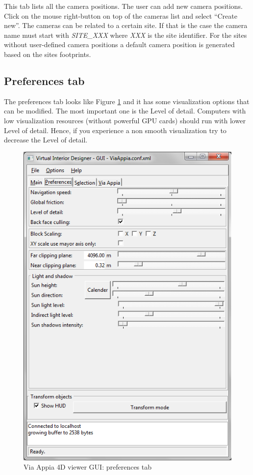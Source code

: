 \documentclass[a4paper,11pt]{article}
\begin{document}
This tab lists all the camera positions. The user can add new camera positions. Click on the mouse right-button on top of the cameras list and select ``Create new''. The cameras can be related to a certain site. If that is the case the camera name must start with \textit{SITE\_XXX} where \textit{XXX} is the site identifier. For the sites without user-defined camera positions a default camera position is generated based on the sites footprints.

\subsection{Preferences tab}

The preferences tab looks like Figure \ref{fig-guipref} and it has some visualization options that can be modified. The most important one is the Level of detail. Computers with low visualization resources (without powerful GPU cards) should run with lower Level of detail. Hence, if you experience a non smooth visualization try to decrease the Level of detail.

\begin{figure}[!ht]
\centering
\includegraphics[scale=0.5]{fig/preferences}
\caption{Via Appia 4D viewer GUI: preferences tab}
\label{fig-guipref}
\end{figure}
\end{document}

